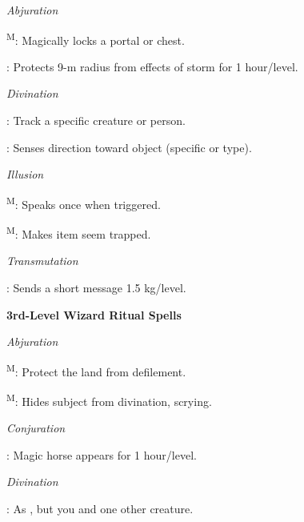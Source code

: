 \noindent\textit{Abjuration}
\begin{itemize*}
	\item[] \textsuperscript{M}: Magically locks a portal or chest.
	\item[] : Protects 9-m radius from effects of storm for 1 hour/level.%
\end{itemize*}

\noindent\textit{Divination}
\begin{itemize*}
	\item[] : Track a specific creature or person. %
	\item[] : Senses direction toward object (specific or type).
\end{itemize*}

\noindent\textit{Illusion}
\begin{itemize*}
	\item[] \textsuperscript{M}: Speaks once when triggered.
	\item[] \textsuperscript{M}: Makes item seem trapped.
\end{itemize*}

\noindent\textit{Transmutation}
\begin{itemize*}
	\item[] : Sends a short message 1.5 kg/level.
\end{itemize*}

\noindent\textbf{3rd-Level Wizard Ritual Spells}

\noindent\textit{Abjuration}
\begin{itemize*}
	\item[] \textsuperscript{M}: Protect the land from defilement. %
	\item[] \textsuperscript{M}: Hides subject from divination, scrying.
\end{itemize*}

\noindent\textit{Conjuration}
\begin{itemize*}
	\item[] : Magic horse appears for 1 hour/level.
\end{itemize*}

\noindent\textit{Divination}
\begin{itemize*}
	\item[] : As , but you and one other creature.
\end{itemize*}

